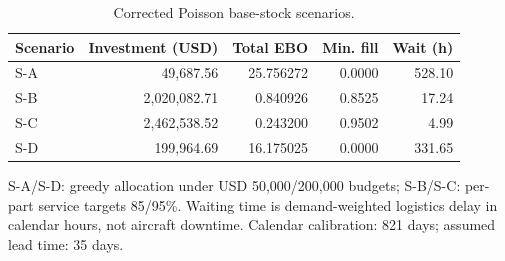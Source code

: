 \begin{table}[htbp]
\centering
\small
\caption{Corrected Poisson base-stock scenarios.}
\label{tab:a2-metric-scenarios}
\begin{tabular}{lrrrr}
\toprule
Scenario & Investment (USD) & Total EBO & Min. fill & Wait (h) \\
\midrule
S-A & 49,687.56 & 25.756272 & 0.0000 & 528.10 \\
S-B & 2,020,082.71 & 0.840926 & 0.8525 & 17.24 \\
S-C & 2,462,538.52 & 0.243200 & 0.9502 & 4.99 \\
S-D & 199,964.69 & 16.175025 & 0.0000 & 331.65 \\
\bottomrule
\end{tabular}
\par\smallskip
{\footnotesize S-A/S-D: greedy allocation under USD 50,000/200,000 budgets; S-B/S-C: per-part service targets 85/95\%. Waiting time is demand-weighted logistics delay in calendar hours, not aircraft downtime. Calendar calibration: 821 days; assumed lead time: 35 days.}
\end{table}
